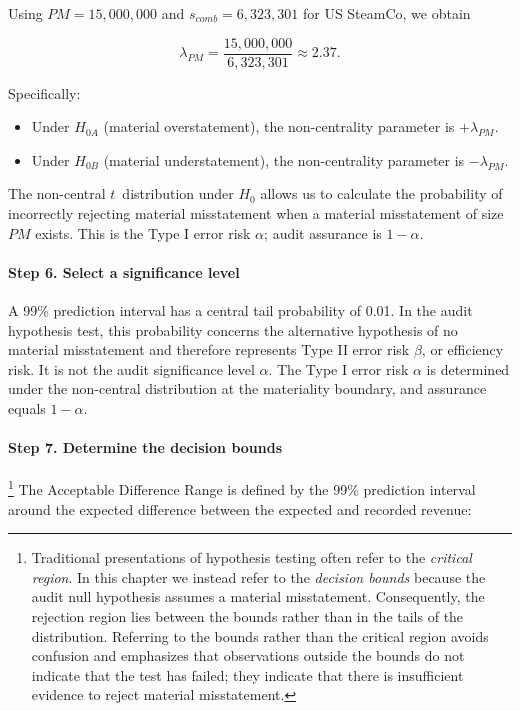 Using $PM = 15,000,000$ and $s_{comb} = 6,323,301$ for US SteamCo, we obtain

\[
\lambda_{PM} = \frac{15,000,000}{6,323,301} \approx 2.37.
\]

Specifically:
\begin{itemize}
\item Under $H_{0A}$ (material overstatement), the non-centrality parameter is $+\lambda_{PM}$.
\item Under $H_{0B}$ (material understatement), the non-centrality parameter is $-\lambda_{PM}$.
\end{itemize}

\bigskip
The non-central $t$~distribution under $H_0$ allows us to calculate the probability of incorrectly rejecting material misstatement when a material misstatement of size $PM$ exists. This is the Type I error risk $\alpha$; audit assurance is $1-\alpha$.

\paragraph{Step 6. Select a significance level}
A 99\% prediction interval has a central tail probability of 0.01. In the audit hypothesis test, this probability concerns the alternative hypothesis of no material misstatement and therefore represents Type II error risk $\beta$, or efficiency risk. It is not the audit significance level $\alpha$. The Type I error risk $\alpha$ is determined under the non-central distribution at the materiality boundary, and assurance equals $1-\alpha$.

\paragraph{Step 7. Determine the decision bounds}\footnote{
Traditional presentations of hypothesis testing often refer to the \emph{critical region}. In this chapter we instead refer to the \emph{decision bounds} because the audit null hypothesis assumes a material misstatement. Consequently, the rejection region lies between the bounds rather than in the tails of the distribution. Referring to the bounds rather than the critical region avoids confusion and emphasizes that observations outside the bounds do not indicate that the test has failed; they indicate that there is insufficient evidence to reject material misstatement.}
\nopagebreak[4]
The Acceptable Difference Range is defined by the 99\% prediction interval around the expected difference between the expected and recorded revenue:


